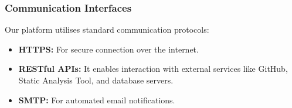 \subsubsection{Communication Interfaces}
Our platform utilises standard communication protocols:

\begin{itemize}
    \item \textbf{HTTPS:} For secure connection over the internet.

    \item \textbf{RESTful APIs:} It enables interaction with external services like GitHub, Static Analysis Tool, and database servers.

    \item \textbf{SMTP:} For automated email notifications.
\end{itemize}
